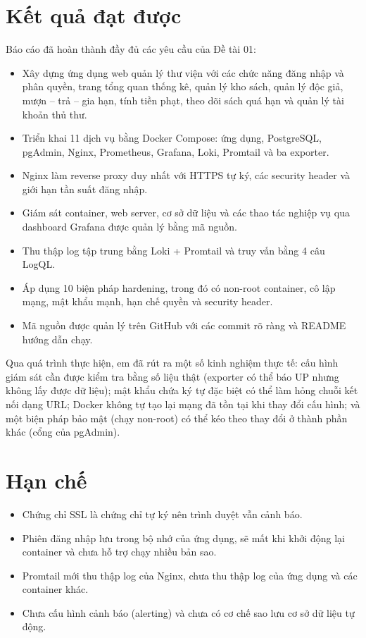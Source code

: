\documentclass[../main.tex]{subfiles}
\begin{document}
\section*{Kết quả đạt được}
Báo cáo đã hoàn thành đầy đủ các yêu cầu của Đề tài 01:
\begin{itemize}
    \item Xây dựng ứng dụng web quản lý thư viện với các chức năng đăng nhập và phân quyền, trang tổng quan thống kê, quản lý kho sách, quản lý độc giả, mượn -- trả -- gia hạn, tính tiền phạt, theo dõi sách quá hạn và quản lý tài khoản thủ thư.
    \item Triển khai 11 dịch vụ bằng Docker Compose: ứng dụng, PostgreSQL, pgAdmin, Nginx, Prometheus, Grafana, Loki, Promtail và ba exporter.
    \item Nginx làm reverse proxy duy nhất với HTTPS tự ký, các security header và giới hạn tần suất đăng nhập.
    \item Giám sát container, web server, cơ sở dữ liệu và các thao tác nghiệp vụ qua dashboard Grafana được quản lý bằng mã nguồn.
    \item Thu thập log tập trung bằng Loki + Promtail và truy vấn bằng 4 câu LogQL.
    \item Áp dụng 10 biện pháp hardening, trong đó có non-root container, cô lập mạng, mật khẩu mạnh, hạn chế quyền và security header.
    \item Mã nguồn được quản lý trên GitHub với các commit rõ ràng và README hướng dẫn chạy.
\end{itemize}

Qua quá trình thực hiện, em đã rút ra một số kinh nghiệm thực tế: cấu hình giám sát cần được kiểm tra bằng số liệu thật (exporter có thể báo UP nhưng không lấy được dữ liệu); mật khẩu chứa ký tự đặc biệt có thể làm hỏng chuỗi kết nối dạng URL; Docker không tự tạo lại mạng đã tồn tại khi thay đổi cấu hình; và một biện pháp bảo mật (chạy non-root) có thể kéo theo thay đổi ở thành phần khác (cổng của pgAdmin).

\section*{Hạn chế}
\begin{itemize}
    \item Chứng chỉ SSL là chứng chỉ tự ký nên trình duyệt vẫn cảnh báo.
    \item Phiên đăng nhập lưu trong bộ nhớ của ứng dụng, sẽ mất khi khởi động lại container và chưa hỗ trợ chạy nhiều bản sao.
    \item Promtail mới thu thập log của Nginx, chưa thu thập log của ứng dụng và các container khác.
    \item Chưa cấu hình cảnh báo (alerting) và chưa có cơ chế sao lưu cơ sở dữ liệu tự động.
\end{itemize}
\end{document}
